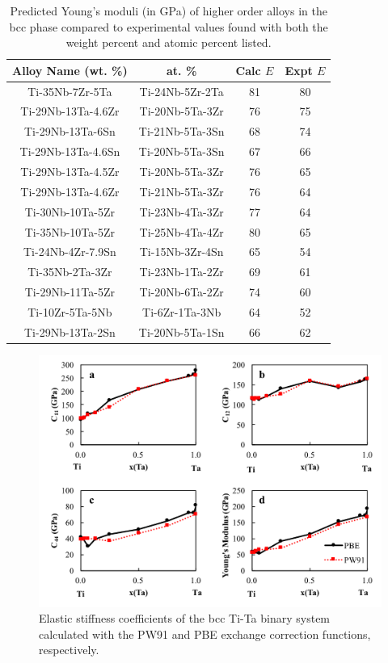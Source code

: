 \newpage
\begin{table}[H]
	\caption{Predicted Young's moduli (in GPa) of higher order alloys in the bcc phase compared to experimental values found with both the weight percent and atomic percent listed.}
	\centering
	\begin{tabular}{ c c c c }
		\hline
		Alloy Name (wt. \%) & at. \% & Calc $E$ & Expt $E$\\
		\hline
		Ti-35Nb-7Zr-5Ta \cite{Geetha2009} & Ti-24Nb-5Zr-2Ta & 81 & 80\\
		Ti-29Nb-13Ta-4.6Zr \cite{Geetha2009}  & Ti-20Nb-5Ta-3Zr & 76 & 75\\
		Ti-29Nb-13Ta-6Sn \cite{Geetha2009} & Ti-21Nb-5Ta-3Sn & 68 & 74\\
		Ti-29Nb-13Ta-4.6Sn \cite{Geetha2009} & Ti-20Nb-5Ta-3Sn & 67 & 66\\
		Ti-29Nb-13Ta-4.5Zr \cite{Geetha2009} & Ti-20Nb-5Ta-3Zr & 76 & 65\\
		Ti-29Nb-13Ta-4.6Zr \cite{Tane2010a} & Ti-21Nb-5Ta-3Zr & 76 & 64\\
		Ti-30Nb-10Ta-5Zr \cite{Tane2010a} & Ti-23Nb-4Ta-3Zr & 77 & 64\\
		Ti-35Nb-10Ta-5Zr \cite{Tane2010a} & Ti-25Nb-4Ta-4Zr & 80 & 65\\
		Ti-24Nb-4Zr-7.9Sn \cite{Mohammed2014} & Ti-15Nb-3Zr-4Sn & 65 & 54\\
		Ti-35Nb-2Ta-3Zr \cite{Mohammed2014} & Ti-23Nb-1Ta-2Zr & 69 & 61\\
		Ti-29Nb-11Ta-5Zr \cite{Mohammed2014} & Ti-20Nb-6Ta-2Zr & 74 & 60\\
		Ti-10Zr-5Ta-5Nb \cite{Mohammed2014} & Ti-6Zr-1Ta-3Nb & 64 & 52\\
		Ti-29Nb-13Ta-2Sn \cite{Mohammed2014} & Ti-20Nb-5Ta-1Sn & 66 & 62\\
		\hline
	\end{tabular}
	\label{Ch5-table:tixdatacomp}
\end{table}
\clearpage

\pagebreak
\begin{figure}[H]
	\centering
	\includegraphics[width=\textwidth]{Chapter-5/Figures/PBEvsPW91.png}
	\caption{Elastic stiffness coefficients of the bcc Ti-Ta binary system calculated with the PW91 and PBE exchange correction functions, respectively.}
	\label{Ch5-figure:PBEvsPW91}
\end{figure}

